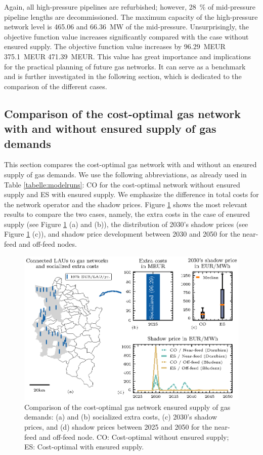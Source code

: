 Again, all high-pressure pipelines are refurbished; however, \SI{28}{\%} of mid-pressure pipeline lengths are decommissioned. The maximum capacity of the high-pressure network level is \SI{465.06}{} and \SI{66.36}{MW} of the mid-pressure. Unsurprisingly, the objective function value increases significantly compared with the case without ensured supply. The objective function value increases by \SI{96.29}{MEUR}  \SI{375.1}{MEUR}  \SI{471,39}{MEUR}. This value has great importance and implications for the practical planning of future gas networks. It can serve as a benchmark and is further investigated in the following section, which is dedicated to the comparison of the different cases.

\subsection{Comparison of the cost-optimal gas network with and without ensured supply of gas demands}\label{res:com}
This section compares the cost-optimal gas network with and without an ensured supply of gas demands. We use the following abbreviations, as already used in Table \ref{tabelle:modelruns}: CO for the cost-optimal network without ensured supply and ES with ensured supply. We emphasize the difference in total costs for the network operator and the shadow prices. Figure \ref{fig:result3} shows the most relevant results to compare the two cases, namely, the extra costs in the case of ensured supply (see Figure \ref{fig:result3} (a) and (b)), the distribution of 2030's shadow prices (see Figure \ref{fig:result3} (c)), and shadow price development between 2030 and 2050 for the near-feed and off-feed nodes.

\begin{figure}[h]
	\centering
	\includegraphics[width=1\linewidth]{figures/Comparison/network.eps}
	\caption{Comparison of the cost-optimal gas network  ensured supply of gas demands: (a) and (b) socialized extra costs, (c) 2030's shadow prices, and (d) shadow prices between 2025 and 2050 for the near-feed and off-feed node. CO: Cost-optimal without ensured supply; ES: Cost-optimal with ensured supply.}
	\label{fig:result3}
\end{figure}

